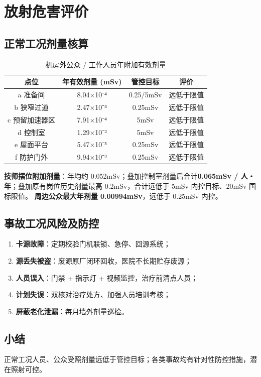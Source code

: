 \chapter{放射危害评价}

\section{正常工况剂量核算}


\begin{table}[H]
\centering
\caption{机房外公众 / 工作人员年附加有效剂量}
\begin{tabular}{|c|c|c|c|}
\hline
点位 & 年有效剂量 (mSv) & 管控目标 & 评价 \\
\hline
a 准备间 & 8.04×10⁻⁴ & 0.25/5mSv & 远低于限值 \\
\hline
b 狭窄过道 & 2.47×10⁻⁴ & 0.25mSv & 远低于限值 \\
\hline
c 预留加速器区 & 7.91×10⁻⁴ & 5mSv & 远低于限值 \\
\hline
d 控制室 & 1.29×10⁻² & 5mSv & 远低于限值 \\
\hline
e 屋面平台 & 5.47×10⁻⁵ & 0.25mSv & 远低于限值 \\
\hline
f 防护门外 & 9.94×10⁻³ & 0.25mSv & 远低于限值 \\
\hline
\end{tabular}
\end{table}


\textbf{技师摆位附加剂量}：年均约 0.052mSv；叠加控制室剂量后合计\textbf{0.065mSv / 人・年}；叠加原有岗位历史剂量最高 0.2mSv，合计远低于 5mSv 内控目标、20mSv 国标限值。
\textbf{周边公众最大年剂量 0.00994mSv}，远低于 0.25mSv 内控。

\section{事故工况风险及防控}

\begin{enumerate}
\item \textbf{卡源故障}：定期校验门机联锁、急停、回源系统；
\item \textbf{源丢失被盗}：废源原厂闭环回收，医院不长期贮存废源；
\item \textbf{人员误入}：门禁 + 指示灯 + 视频监控，治疗前清点人员；
\item \textbf{计划失误}：双核对治疗处方、加强人员培训考核；
\item \textbf{屏蔽老化泄漏}：每月墙外剂量巡检。
\end{enumerate}

\section{小结}

正常工况人员、公众受照剂量远低于管控目标；各类事故均有针对性防控措施，潜在照射可控。

